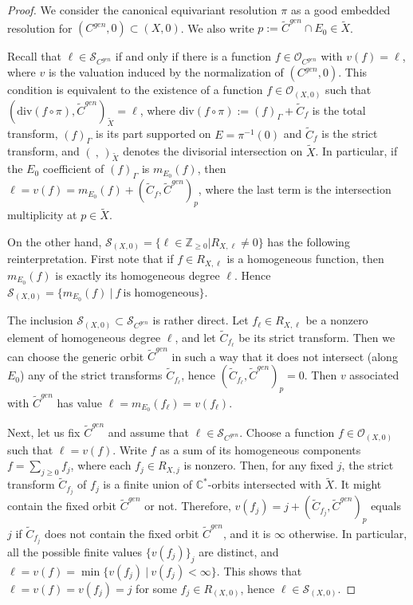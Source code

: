 \documentclass[12pt,a4paper]{amsart}
\def\cS{{\mathcal S}}
\def\cO{\mathcal{O}}
\def\div{\textrm{div}}
\theoremstyle{remark}
\theoremstyle{definition}
\begin{document}
\begin{proof}
 We consider the canonical equivariant resolution $\pi$ as a good embedded resolution for $(C^{gen},0)\subset (X,0)$. We also write $p:=\tilde{C}^{gen}\cap E_0\in \tilde{X}$. 
 
 Recall that $\ell \in \cS_{C^{gen}}$ if and only if there is a function $f\in \cO_{C^{gen}}$ with $v(f)=\ell$, where $v$ is the valuation induced by the normalization of $(C^{gen},0)$. This condition is equivalent to the existence of a function $f\in \cO_{(X,0)}$ such that $(\div(f\circ \pi),\tilde C^{gen})_{\tilde{X}}=\ell$, where $\div(f\circ \pi):=(f)_{\Gamma}+\tilde C_f$ is the total transform,  $(f)_{\Gamma}$ is its part supported on $E=\pi^{-1}(0)$ and $\tilde C_f$ is the strict transform, and $(\ ,\, )_{\tilde{X}}$ denotes the divisorial intersection on $\tilde{X}$.
In particular, if the $E_0$ coefficient of $(f)_\Gamma$ is $m_{E_0}(f)$, then 
$\ell=v(f)=m_{E_0}(f)+(\tilde{C}_f, \tilde{C}^{gen})_p$, where the last term is the intersection multiplicity at $p\in\tilde{X}$. 

On the other hand, $\cS_{(X,0)}=\{\ell\in\mathbb{Z}_{\geq 0} | R_{X,\ell}\neq 0\}$ has the following reinterpretation. First note that if $f\in R_{X, \ell}$ is a homogeneous function, then 
$m_{E_0}(f)$ is exactly its homogeneous degree $\ell$. Hence  $\cS_{(X,0)}
= \{ m_{E_{0}}(f)\ |\ f \ \mbox{is homogeneous}\}$. 

The inclusion $\cS_{(X,0)}\subset  \cS_{C^{gen}}$ is rather direct. Let $f_{\ell}\in  R_{X,\ell}$
be a nonzero element of homogeneous degree $\ell$, and let $\tilde{C}_{f_{\ell}}$ be its strict transform. 
Then we can choose the generic orbit $\tilde{C}^{gen}$ in such a way that 
it does not intersect (along $E_0$) any of the strict transforms $\tilde{C}_{f_{\ell}}$, hence $(\tilde{C}_{f_{\ell}}, \tilde{C}^{gen})_p=0$.
Then $v$ associated with  $\tilde{C}^{gen}$ has value $\ell=m_{E_0}(f_\ell)=v(f_\ell)$.

Next, let us fix $\tilde{C}^{gen}$  and 
assume that $\ell\in  \cS_{C^{gen}}$. Choose  a function $f\in \cO_{(X,0)}$ such that 
$\ell=v(f)$. Write $f$ as a sum of  its homogeneous components $f=\sum _{j\geq 0} f_j$, where 
each $f_j \in R_{X,j}$ is nonzero. Then, for any fixed $j$, the strict transform $\tilde{C}_{f_j}$
of $f_j$ is a finite union of $\mathbb{C}^*$-orbits  intersected with $\tilde{X}$. 
It might contain the fixed orbit $\tilde{C}^{gen}$ or not. 
Therefore, $v(f_j)=j+(\tilde{C}_{f_j}, \tilde{C}^{gen})_p$ equals $j$ if 
$\tilde{C}_{f_j}$ does not contain the fixed orbit $\tilde{C}^{gen}$, and it is $\infty$ otherwise. 
In particular, all the possible finite values $\{v(f_j)\}_j$ are distinct, and 
$\ell=v(f)=\min \{v(f_j)\ |\  v(f_j)<\infty\}$. This shows that $\ell=v(f)=v(f_j)=j$
for some $f_j\in R_{(X,0)}$, hence $\ell\in \cS_{(X,0)} $. 
\end{proof}
\end{document}
